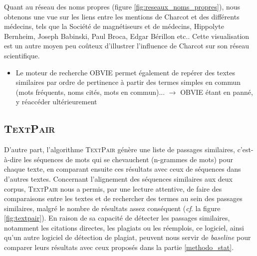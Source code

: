 Quant au réseau des noms propres (figure \ref{fig:reseaux_noms_propres}), nous obtenons une vue sur les liens entre les mentions de Charcot et des différents médecins, tels que la Société de magnétiseurs et de médecins, Hippolyte Bernheim, Joseph Babinski, Paul Broca, Edgar Bérillon etc.. Cette visualisation est un autre moyen peu coûteux d'illustrer l'influence de Charcot sur son réseau scientifique.

\begin{tcolorbox}[colback=yellow!10!white,colframe=red!75!black,title=agenda]
	\begin{itemize}
		\item Le moteur de recherche \textsc{OBVIE} permet également de repérer des textes similaires par ordre de pertinence à partir des termes simples en commun (mots fréquents, noms cités, mots en commun)... $\rightarrow$ OBVIE étant en panné, y réaccéder ultérieurement

		
	\end{itemize}
\end{tcolorbox}














\subsection{\textsc{TextPair}}

D'autre part, l'algorithme \textsc{TextPair} génère une liste de passages similaires, c'est-à-dire les séquences de mots qui se chevauchent (n-grammes de mots) pour chaque texte, en comparant ensuite ces résultats avec ceux de séquences dans d'autres textes. Concernant l'alignement des séquences similaires aux deux corpus, \textsc{TextPair} nous a permis, par une lecture attentive, de faire des comparaisons entre les textes et de rechercher des termes au sein des passages similaires, malgré le nombre de résultats assez conséquent (\textit{cf}. la figure \ref{fig:textpair}). En raison de sa capacité de détecter les passages similaires, notamment les citations directes, les plagiats ou les réemplois, ce logiciel, ainsi qu'un autre logiciel de détection de plagiat, peuvent nous servir de \textit{baseline} pour comparer leurs résultats avec ceux proposés dans la partie \ref{methodo_stat}.



